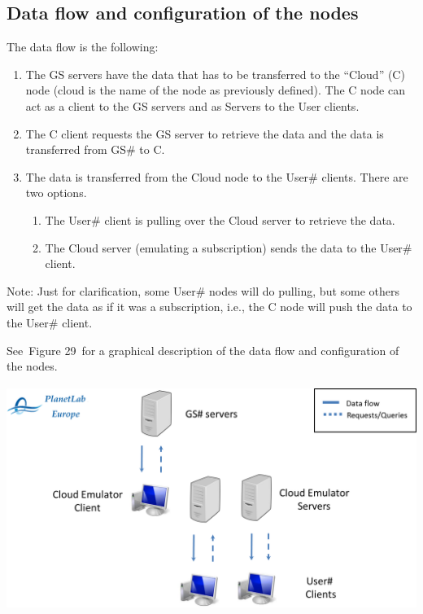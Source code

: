 \documentclass[a4paper]{article}
\newcounter{saveenum}
\newcommand\liststyleLFOxxxv{%
\renewcommand\theenumi{\arabic{enumi}}
\renewcommand\theenumii{\alph{enumii}}
\renewcommand\theenumiii{\roman{enumiii}}
\renewcommand\theenumiv{\arabic{enumiv}}
\renewcommand\labelenumi{\theenumi.}
\renewcommand\labelenumii{\theenumii.}
\renewcommand\labelenumiii{\theenumiii.}
\renewcommand\labelenumiv{\theenumiv.}
}
\begin{document}
\bigskip

\subsection[Data flow and configuration of the nodes]{Data flow and
configuration of the nodes}
\hypertarget{Toc381777256}{}
\bigskip

The data flow is the following:

\liststyleLFOxxxv
\setcounter{saveenum}{\value{enumi}}
\begin{enumerate}
\setcounter{enumi}{\value{saveenum}}
\item The GS servers have the data that has to be transferred to the
{\textquotedblleft}Cloud{\textquotedblright} (C) node (cloud is the
name of the node as previously defined). The C node can act as a client
to the GS servers and as Servers to the User clients.
\item The C client requests the GS server to retrieve the data and the
data is transferred from GS\# to C.
\item The data is transferred from the Cloud node to the User\# clients.
There are two options.

\setcounter{saveenum}{\value{enumii}}
\begin{enumerate}
\setcounter{enumii}{\value{saveenum}}
\item The User\# client is pulling over the Cloud server to retrieve the
data.
\item The Cloud server (emulating a subscription) sends the data to the
User\# client.
\end{enumerate}
\end{enumerate}
Note: Just for clarification, some User\# nodes will do pulling, but
some others will get the data as if it was a subscription, i.e., the C
node will push the data to the User\# client.

See\ Figure 29\ for a graphical description of the data flow and
configuration of the nodes.


\bigskip

{\centering 
\includegraphics[width=5.38135in,height=2.87144in]{out-img54.png} \par}
\end{document}

